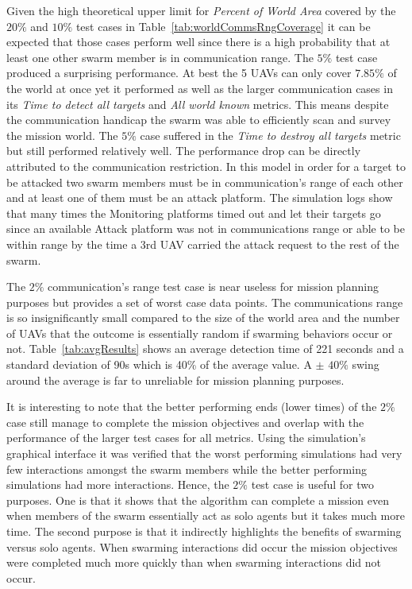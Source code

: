 \begin{multicols*}{2}
Given the high theoretical upper limit for \textit{Percent of World Area} covered by the $20\%$ and $10\%$ test cases in Table~\ref{tab:worldCommsRngCoverage} it can be expected that those cases perform well since there is a high probability that at least one other swarm member is in communication range.  The $5\%$ test case produced a surprising performance.  At best the 5 UAVs can only cover $7.85\%$ of the world at once yet it performed as well as the larger communication cases in its \textit{Time to detect all targets} and \textit{All world known} metrics.  This means despite the communication handicap the swarm was able to efficiently scan and survey the mission world.  The $5\%$ case suffered in the \textit{Time to destroy all targets} metric but still performed relatively well.  The performance drop can be directly attributed to the communication restriction.  In this model in order for a target to be attacked two swarm members must be in communication's range of each other and at least one of them must be an attack platform.  The simulation logs show that many times the Monitoring platforms timed out and let their targets go since an available Attack platform was not in communications range or able to be within range by the time a 3rd UAV carried the attack request to the rest of the swarm.

The $2\%$ communication's range test case is near useless for mission planning purposes but provides a set of worst case data points.  The communications range is so insignificantly small compared to the size of the world area and the number of UAVs that the outcome is essentially random if swarming behaviors occur or not.  Table~\ref{tab:avgResults} shows an average detection time of 221 seconds and a standard deviation of 90s which is 40\% of the average value.  A $\pm$ $40\%$ swing around the average is far to unreliable for mission planning purposes.

It is interesting to note that the better performing ends (lower times) of the $2\%$ case still manage to complete the mission objectives and overlap with the performance of the larger test cases for all metrics. Using the simulation's graphical interface it was verified that the worst performing simulations had very few interactions amongst the swarm members while the better performing simulations had more interactions.  Hence, the $2\%$ test case is useful for two purposes.  One is that it shows that the algorithm can complete a mission even when members of the swarm essentially act as solo agents but it takes much more time.  The second purpose is that it indirectly highlights the benefits of swarming versus solo agents.  When swarming interactions did occur the mission objectives were completed much more quickly than when swarming interactions did not occur.


\end{multicols*}
